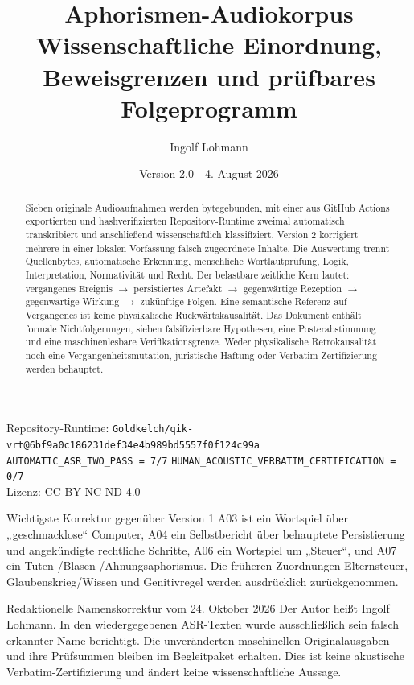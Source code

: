 \documentclass[11pt,a4paper]{article}
\title{\sffamily\bfseries\Huge Aphorismen-Audiokorpus\\[0.3em]\Large Wissenschaftliche Einordnung, Beweisgrenzen und prüfbares Folgeprogramm}
\author{Ingolf Lohmann}
\date{Version 2.0 - 4. August 2026}
\newcommand{\status}[1]{\texttt{#1}}
\begin{document}
\maketitle
\begin{center}
\small Repository-Runtime: \status{Goldkelch/qik-vrt@6bf9a0c186231def34e4b989bd5557f0f124c99a}\\
\status{AUTOMATIC\_ASR\_TWO\_PASS = 7/7} \quad
\status{HUMAN\_ACOUSTIC\_VERBATIM\_CERTIFICATION = 0/7}\\
Lizenz: CC BY-NC-ND 4.0
\end{center}

\begin{abstract}
Sieben originale Audioaufnahmen werden bytegebunden, mit einer aus GitHub Actions exportierten und hashverifizierten Repository-Runtime zweimal automatisch transkribiert und anschließend wissenschaftlich klassifiziert. Version 2 korrigiert mehrere in einer lokalen Vorfassung falsch zugeordnete Inhalte. Die Auswertung trennt Quellenbytes, automatische Erkennung, menschliche Wortlautprüfung, Logik, Interpretation, Normativität und Recht. Der belastbare zeitliche Kern lautet: vergangenes Ereignis $\rightarrow$ persistiertes Artefakt $\rightarrow$ gegenwärtige Rezeption $\rightarrow$ gegenwärtige Wirkung $\rightarrow$ zukünftige Folgen. Eine semantische Referenz auf Vergangenes ist keine physikalische Rückwärtskausalität. Das Dokument enthält formale Nichtfolgerungen, sieben falsifizierbare Hypothesen, eine Posterabstimmung und eine maschinenlesbare Verifikationsgrenze. Weder physikalische Retrokausalität noch eine Vergangenheitsmutation, juristische Haftung oder Verbatim-Zertifizierung werden behauptet.
\end{abstract}

\begin{boundarybox}{Wichtigste Korrektur gegenüber Version 1}
A03 ist ein Wortspiel über „geschmacklose“ Computer, A04 ein Selbstbericht über behauptete Persistierung und angekündigte rechtliche Schritte, A06 ein Wortspiel um „Steuer“, und A07 ein Tuten-/Blasen-/Ahnungsaphorismus. Die früheren Zuordnungen Elternsteuer, Glaubenskrieg/Wissen und Genitivregel werden ausdrücklich zurückgenommen.
\end{boundarybox}

\begin{boundarybox}{Redaktionelle Namenskorrektur vom 24. Oktober 2026}
Der Autor heißt Ingolf Lohmann. In den wiedergegebenen ASR-Texten wurde ausschließlich sein falsch erkannter Name berichtigt. Die unveränderten maschinellen Originalausgaben und ihre Prüfsummen bleiben im Begleitpaket erhalten. Dies ist keine akustische Verbatim-Zertifizierung und ändert keine wissenschaftliche Aussage.
\end{boundarybox}
\end{document}
